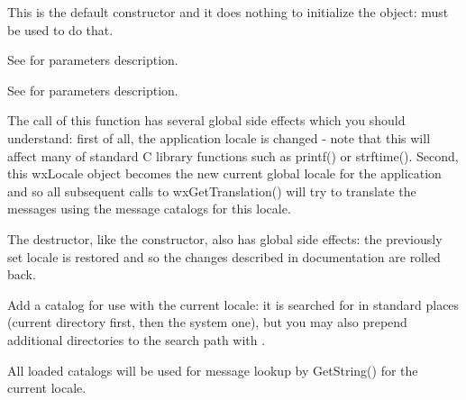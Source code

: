 



\label{wxlocaledefctor}


This is the default constructor and it does nothing to initialize the object: 
 must be used to do that.


See  for parameters description.


See  for parameters description.

The call of this function has several global side effects which you should
understand: first of all, the application locale is changed - note that this
will affect many of standard C library functions such as printf() or strftime().
Second, this wxLocale object becomes the new current global locale for the
application and so all subsequent calls to wxGetTranslation() will try to
translate the messages using the message catalogs for this locale.


\label{wxlocaledtor}


The destructor, like the constructor, also has global side effects: the previously
set locale is restored and so the changes described in 
 documentation are rolled back.

\label{wxlocaleaddcatalog}


Add a catalog for use with the current locale: it is searched for in standard
places (current directory first, then the system one), but you may also prepend
additional directories to the search path with 
.

All loaded catalogs will be used for message lookup by GetString() for the
current locale.

